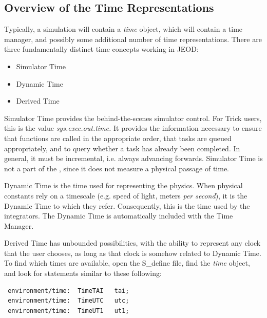 %
%
%
%

\label{sec:User_Analysis}
\subsection{Overview of the Time Representations}
Typically, a simulation will contain a \textit{time} object, which will
contain a time manager, and possibly some additional number of time
representations.  There are three fundamentally distinct time concepts
working in JEOD:


\begin{itemize}
\item Simulator Time
\item Dynamic Time
\item Derived Time
\end{itemize}



Simulator Time provides the behind-the-scenes simulator control.  For
Trick users, this is the value \textit{sys.exec.out.time.} It provides
the information necessary to ensure that functions are called in the
appropriate order, that tasks are queued appropriately, and to query
whether a task has already been completed.  In general, it must be
incremental, i.e. always advancing forwards.  Simulator Time is not a
part of the \timeDesc, since it does not measure a physical passage of
time.

Dynamic Time is the time used for representing the physics.  When
physical constants rely on a timescale (e.g. speed of light, meters
\textit{per second}), it is the Dynamic Time to which they refer.
Consequently, this is the time used by the integrators.  The Dynamic
Time is automatically included with the Time Manager.

Derived Time has unbounded possibilities, with the ability to represent
any clock that the user chooses, as long as that clock is somehow
related to Dynamic Time.  To find which times are available, open the
S\_define file, find the \textit{time }object, and look for statements
similar to these following:

\begin{verbatim}
 environment/time:  TimeTAI   tai;
 environment/time:  TimeUTC   utc;
 environment/time:  TimeUT1   ut1;
\end{verbatim}

